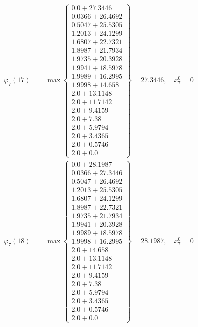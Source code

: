 \documentclass{article}
\begin{document}
\begin{align*}
  
\varphi_{7}(17) &= \max \left\{ \begin{array}{c}
0.0 + 27.3446 \\
 0.0366 + 26.4692 \\
 0.5047 + 25.5305 \\
 1.2013 + 24.1299 \\
 1.6807 + 22.7321 \\
 1.8987 + 21.7934 \\
 1.9735 + 20.3928 \\
 1.9941 + 18.5978 \\
 1.9989 + 16.2995 \\
 1.9998 + 14.658 \\
 2.0 + 13.1148 \\
 2.0 + 11.7142 \\
 2.0 + 9.4159 \\
 2.0 + 7.38 \\
 2.0 + 5.9794 \\
 2.0 + 3.4365 \\
 2.0 + 0.5746 \\
 2.0 + 0.0
\end{array} \right\}=27.3446,\quad x_{7}^0=0\\
  
  
  
  
\varphi_{7}(18) &= \max \left\{ \begin{array}{c}
0.0 + 28.1987 \\
 0.0366 + 27.3446 \\
 0.5047 + 26.4692 \\
 1.2013 + 25.5305 \\
 1.6807 + 24.1299 \\
 1.8987 + 22.7321 \\
 1.9735 + 21.7934 \\
 1.9941 + 20.3928 \\
 1.9989 + 18.5978 \\
 1.9998 + 16.2995 \\
 2.0 + 14.658 \\
 2.0 + 13.1148 \\
 2.0 + 11.7142 \\
 2.0 + 9.4159 \\
 2.0 + 7.38 \\
 2.0 + 5.9794 \\
 2.0 + 3.4365 \\
 2.0 + 0.5746 \\
 2.0 + 0.0
\end{array} \right\}=28.1987,\quad x_{7}^0=0\\
  

\end{align*}
\end{document}
